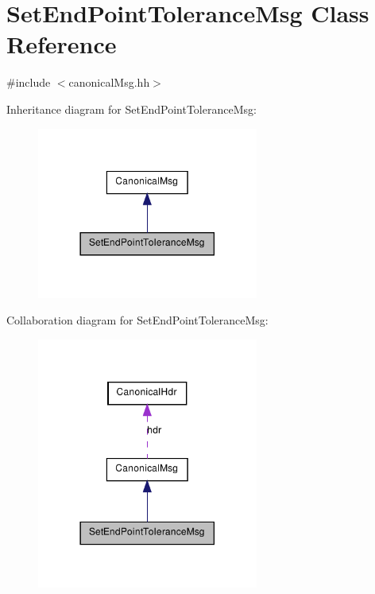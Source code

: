 \hypertarget{class_set_end_point_tolerance_msg}{
\section{SetEndPointToleranceMsg Class Reference}
\label{class_set_end_point_tolerance_msg}
}


{\ttfamily \#include $<$canonicalMsg.hh$>$}



Inheritance diagram for SetEndPointToleranceMsg:\nopagebreak
\begin{figure}[H]
\begin{center}
\leavevmode
\includegraphics[width=206pt]{class_set_end_point_tolerance_msg__inherit__graph}
\end{center}
\end{figure}


Collaboration diagram for SetEndPointToleranceMsg:\nopagebreak
\begin{figure}[H]
\begin{center}
\leavevmode
\includegraphics[width=206pt]{class_set_end_point_tolerance_msg__coll__graph}
\end{center}
\end{figure}
